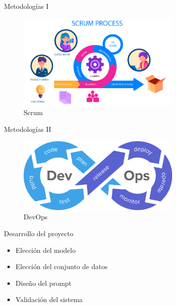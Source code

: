 \documentclass[aspectratio=169,xcolor=dvipsnames, t]{beamer}
\begin{document}
\begin{frame}{Metodologías I}
        \begin{figure}
            \includegraphics[width=8cm]{style_data/img/scrum-methodology.png}        
            \caption{Scrum}
            \label{fig:subim1}
        \end{figure}
\end{frame}

\begin{frame}{Metodologías II}
    
    \begin{figure}
        \includegraphics[width=8cm]{style_data/img/dev-ops.png}        
        \caption{DevOps}
        \label{fig:subim2}
    \end{figure}
    
\end{frame}

\begin{frame}{Desarrollo del proyecto}
    \begin{itemize}
        \item Elección del modelo
        \item Elección del conjunto de datos
        \item Diseño del prompt
        \item Validación del sistema
    \end{itemize}
\end{frame}

\end{document}
